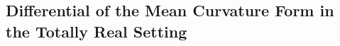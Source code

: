\documentclass[12pt,letterpaper]{amsart}%
\numberwithin{mycounter}{section}
\theoremstyle{plain}
\numberwithin{equation}{section}
\theoremstyle{definition}
\begin{document}

\subsection{%
Differential of the Mean Curvature Form in the Totally Real Setting}\label{pf}
\end{document}
